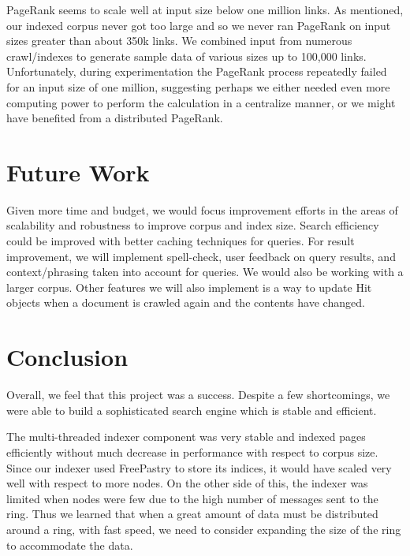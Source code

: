 \documentclass[11pt, letterpaper, oneside, twocolumn]{article}
\begin{document}
PageRank seems to scale well at input size below one million links.
As mentioned, our indexed corpus never got too large and so we never ran PageRank on input sizes greater than about 350k links.
We combined input from numerous crawl/indexes to generate sample data of various sizes up to 100,000 links.
Unfortunately, during experimentation the PageRank process repeatedly failed for an input size of one million, suggesting perhaps we either needed even more computing power to perform the calculation in a centralize manner, or we might have benefited from a distributed PageRank.

\section{Future Work}
\label{sec:future}

Given more time and budget, we would focus improvement efforts in the areas of scalability and robustness to improve corpus and index size.
Search efficiency could be improved with better caching techniques for queries.
For result improvement, we will implement spell-check, user feedback on query results, and context/phrasing taken into account for queries. 
We would also be working with a larger corpus.
Other features we will also implement is a way to update Hit objects when a document is crawled again and the contents have changed.

\section{Conclusion}
\label{sec:conculsion}
Overall, we feel that this project was a success.
Despite a few shortcomings, we were able to build a sophisticated search engine which is stable and efficient.

The multi-threaded indexer component was very stable and indexed pages efficiently without much decrease in performance with respect to corpus size.
Since our indexer used FreePastry to store its indices, it would have scaled very well with respect to more nodes.
On the other side of this, the indexer was limited when nodes were few due to the high number of messages sent to the ring.
Thus we learned that when a great amount of data must be distributed around a ring, with fast speed, we need to consider expanding the size of the ring to accommodate the data.
\end{document}

